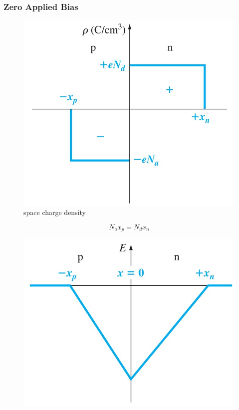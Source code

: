 \documentclass{beamer}
\begin{document}
    \begin{frame} \frametitle{Zero Applied Bias}
        \begin{minipage}{\linewidth}
            \begin{minipage}[b]{0.49\linewidth}
                \begin{figure}[H]
                    \centering
                    \includegraphics[width=0.95\linewidth]{Space-charge-density.jpg}
                    \caption{space charge density}
                    \label{fig:Space-charge-density.jpg}
                \end{figure}
                \begin{equation*}
                    N_a x_p = N_d x_n
                \end{equation*}
            \end{minipage}
            \begin{minipage}[b]{0.49\linewidth}
                \begin{figure}[H]
                    \centering
                    \includegraphics[width=0.95\linewidth]{pn-junction-electric-field.jpg}

\end{figure}
\end{minipage}
\end{minipage}
\end{frame}
\end{document}

